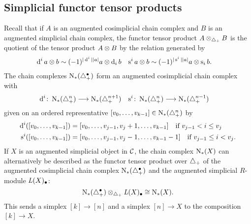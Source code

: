 
\subsection{Simplicial functor tensor products}

Recall that if $A$ is an augmented cosimplicial chain complex and $B$ is an augmented simplicial chain complex, the functor tensor product $A \otimes_{\triangle_{+}} B$ is the quotient of the tensor product $A \otimes B$ by the relation generated by
\begin{align*}
	\operatorname{d}^i a \otimes b &\sim (-1)^{|\operatorname{d}^i||a|}a \otimes \operatorname{d}_i b
	&
	\operatorname{s}^ia \otimes b &\sim (-1)^{|\operatorname{s}^i||a|}a \otimes \operatorname{s}_ib.
\end{align*}
The chain complexes $\operatorname{N}_{*}(\triangle_{+}^\bullet)$ form an augmented cosimplicial chain complex with
\begin{align*}
	\operatorname{d}^i \colon \operatorname{N}_{*}(\triangle_{+}^n)& \longrightarrow \operatorname{N}_{*}(\triangle_{+}^{n+1})
	&
	\operatorname{s}^i \colon \operatorname{N}_{*}(\triangle_{+}^{n})& \longrightarrow \operatorname{N}_{*}(\triangle_{+}^{n-1})
\end{align*}
given on an ordered representative $[v_0,\dots,v_{k-1}]\in \operatorname{N}_{*}(\triangle_{+}^n)$ by
\begin{align*}
\operatorname{d}^i([v_0,\dots,v_{k-1}]) &= [v_0,\dots,v_{j-1},v_j+1,\dots,v_{k-1}] \quad \text{if $v_{j-1}<i\leq v_j$}
\\
\operatorname{s}^i([v_0,\dots,v_{k-1}]) &= [v_0,\dots,v_{j-1},v_j-1,\dots,v_{k-1}-1] \quad \text{if $v_{j-1} \leq i < v_j$}.
\end{align*}
If $X$ is an augmented simplicial object in $\mathcal{C}$, the chain complex $\operatorname{N}_{*}(X)$ can alternatively be described as the functor tensor product over $\triangle_{+}$ of the augmented cosimplicial chain complex $\operatorname{N}_{*}(\triangle_{+}^{\bullet})$ and the augmented simplicial $R$-module $\operatorname{{\it L}}(X)_\bullet$:
\begin{equation}\label{eq:1}
	\operatorname{N}_{*}(\triangle_{+}^\bullet) \otimes_{\triangle_{+}} \operatorname{{\it L}}(X)_\bullet \cong \operatorname{N}_{*}(X).
\end{equation}
This sends a simplex $[k] \to [n]$ and a simplex $[n] \to X$ to the composition $[k] \to X$.

